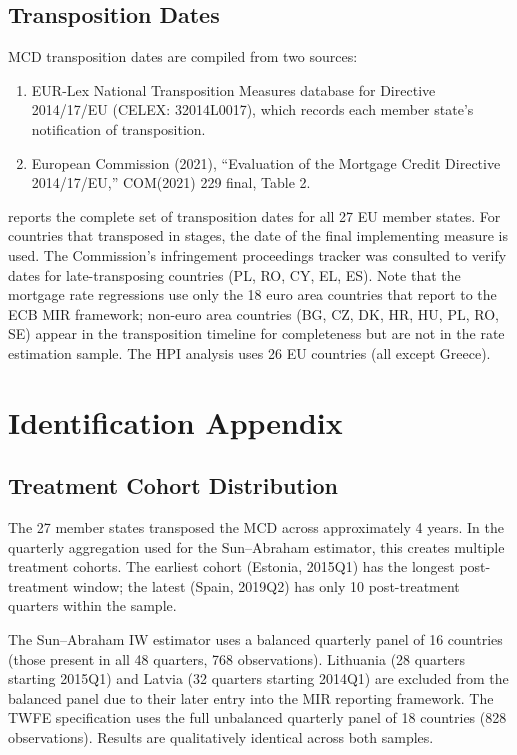 \documentclass[12pt]{article}
\begin{document}
\subsection{Transposition Dates}

MCD transposition dates are compiled from two sources:
\begin{enumerate}
\item EUR-Lex National Transposition Measures database for Directive 2014/17/EU (CELEX: 32014L0017), which records each member state's notification of transposition.
\item European Commission (2021), ``Evaluation of the Mortgage Credit Directive 2014/17/EU,'' COM(2021) 229 final, Table 2.
\end{enumerate}

 reports the complete set of transposition dates for all 27 EU member states. For countries that transposed in stages, the date of the final implementing measure is used. The Commission's infringement proceedings tracker was consulted to verify dates for late-transposing countries (PL, RO, CY, EL, ES). Note that the mortgage rate regressions use only the 18 euro area countries that report to the ECB MIR framework; non-euro area countries (BG, CZ, DK, HR, HU, PL, RO, SE) appear in the transposition timeline for completeness but are not in the rate estimation sample. The HPI analysis uses 26 EU countries (all except Greece).




\section{Identification Appendix}
\label{app:identification}

\subsection{Treatment Cohort Distribution}

The 27 member states transposed the MCD across approximately 4 years. In the quarterly aggregation used for the Sun--Abraham estimator, this creates multiple treatment cohorts. The earliest cohort (Estonia, 2015Q1) has the longest post-treatment window; the latest (Spain, 2019Q2) has only 10 post-treatment quarters within the sample.

The Sun--Abraham IW estimator uses a balanced quarterly panel of 16 countries (those present in all 48 quarters, 768 observations). Lithuania (28 quarters starting 2015Q1) and Latvia (32 quarters starting 2014Q1) are excluded from the balanced panel due to their later entry into the MIR reporting framework. The TWFE specification uses the full unbalanced quarterly panel of 18 countries (828 observations). Results are qualitatively identical across both samples.
\end{document}
